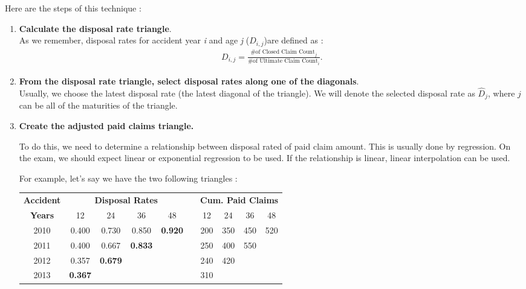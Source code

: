 \documentclass[11pt, english]{memoir}
\numberwithin{definition}{section}
\begin{document}
	Here are the steps of this technique : 
	\begin{enumerate}
		\item \textbf{Calculate the disposal rate triangle}. \\
		As we remember, disposal rates for accident year \emph{i} and age \emph{j} ($ D_{i,j} $)are defined as : 
		\begin{align*}
		D_{i,j} = \frac{\text{\# of Closed Claim Count}_{j}}{\text{\# of Ultimate Claim Count}_{i}}.
		\end{align*}
		
		
		
		
		
		\item \textbf{From the disposal rate triangle, select disposal rates along one of the diagonals}.\\
		Usually, we choose the latest disposal rate (the latest diagonal of the triangle). We will denote the selected disposal rate as $ \hat{D}_{j}$, where $ j $ can be all of the maturities of the triangle. 
		
		
		
		
		
		
		\item \textbf{Create the adjusted paid claims triangle.} 
		
		To do this, we need to determine a relationship between disposal rated of paid claim amount. This is usually done by regression. On the exam, we should expect linear or exponential regression to be used. If the relationship is linear, linear interpolation can be used. 
		
		For example, let's say we have the two following triangles : \\
	
		\begin{tabularx}{0.75\textwidth}{ccccclcccc}
			\toprule
			\textbf{Accident} & \multicolumn{4}{c}{\textbf{Disposal Rates}} & & \multicolumn{4}{c}{\textbf{Cum. Paid Claims}}\\
			\textbf{Years} & 12 & 24 & 36 & 48 & & 12 & 24 & 36 & 48  \\
			\midrule
			2010 & 0.400 & 0.730 & 0.850 & \textbf{0.920} & &  200 & 350 & 450 & 520  \\
			2011 & 0.400 & 0.667 & \textbf{0.833} & & & 250 & 400 & 550 & \\
			2012 & 0.357 & \textbf{0.679} & & & & 240 & 420 & & \\
			2013 & \textbf{0.367} & & &  & & 310 & & & \\
			\bottomrule
		\end{tabularx}\\
		

\end{enumerate}
\end{document}
